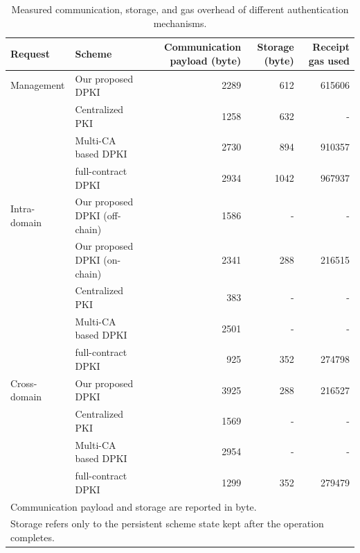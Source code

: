 \begin{table}[t]
\centering
\caption{Measured communication, storage, and gas overhead of different authentication mechanisms.}
\label{tab:overhead-cost}
\scriptsize
\setlength{\tabcolsep}{4.2pt}
\begin{tabular}{llrrr}
\hline
Request & Scheme & Communication payload (byte) & Storage (byte) & Receipt gas used \\
\hline
Management & Our proposed DPKI & 2289 & 612 & 615606 \\
 & Centralized PKI & 1258 & 632 & - \\
 & Multi-CA based DPKI & 2730 & 894 & 910357 \\
 & full-contract DPKI & 2934 & 1042 & 967937 \\
Intra-domain & Our proposed DPKI (off-chain) & 1586 & - & - \\
 & Our proposed DPKI (on-chain) & 2341 & 288 & 216515 \\
 & Centralized PKI & 383 & - & - \\
 & Multi-CA based DPKI & 2501 & - & - \\
 & full-contract DPKI & 925 & 352 & 274798 \\
Cross-domain & Our proposed DPKI & 3925 & 288 & 216527 \\
 & Centralized PKI & 1569 & - & - \\
 & Multi-CA based DPKI & 2954 & - & - \\
 & full-contract DPKI & 1299 & 352 & 279479 \\
\hline
\multicolumn{5}{l}{\footnotesize Communication payload and storage are reported in byte.}\\
\multicolumn{5}{l}{\footnotesize Storage refers only to the persistent scheme state kept after the operation completes.}
\end{tabular}
\end{table}
